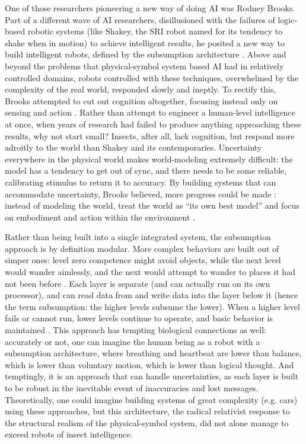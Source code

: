 One of those researchers pioneering a new way of doing AI was Rodney
Brooks. Part of a different wave of AI researchers, disillusioned with
the failures of logic-based robotic systems (like Shakey, the SRI
robot named for its tendency to shake when in motion) \cite[Ch. 10]{mccorduck} to
achieve intelligent results, he posited a new way to build intelligent
robots, defined by the subsumption architecture \cite[p. 353]{mobilebrooks}. Above and
beyond the problems that physical-symbol system based AI had in
relatively controlled domains, robots controlled with these
techniques, overwhelmed by the complexity of the real world, responded
slowly and ineptly. To rectify this, Brooks attempted to cut out
cognition altogether, focusing instead only on sensing and
action \cite[Afterword]{mccorduck}. Rather than attempt to engineer a
human-level intelligence at once, when years of research had failed to
produce anything approaching these results, why not start small?
Insects, after all, lack cognition, but respond more adroitly to the
world than Shakey and its contemporaries. Uncertainty everywhere in
the physical world makes world-modeling extremely difficult: the
model has a tendency to get out of sync, and there needs to be
some reliable, calibrating stimulus to return it to accuracy. By building systems that can
accommodate uncertainty, Brooks believed, more progress could be
made \cite[p. 347]{mobilebrooks}: instead of modeling the world, treat
the world as ``its own best model'' and focus on embodiment and action
within the environment \cite[p. 256]{ekbia}.

Rather than being built into a single integrated system, the
subsumption approach is by definition modular. More complex behaviors
are built out of simper ones: level zero competence might avoid objects,
while the next level would wander aimlessly, and the next would
attempt to wander to places it had not been before \cite[p.
  351--352]{mobilebrooks}. Each layer is separate (and can actually run 
on its own processor), and can read data from
and write data into the layer below it (hence the term subsumption: 
the higher levels subsume the lower). When a higher level fails or
cannot run, lower levels continue to operate, and basic behavior is
maintained \cite[p. 355]{mobilebrooks}. This approach has tempting
biological connections as well:
accurately or not, one can imagine the human being as a robot with a subsumption
architecture, where breathing and heartbeat are lower than balance,
which is lower than voluntary motion, which is lower than logical
thought. And temptingly, it is an approach that can handle
uncertainties, as each layer is built to be robust in the inevitable
event of inaccuracies and lost messages. Theoretically, one could
imagine building systems of great complexity (e.g. cars) using these approaches,
but this architecture, the radical relativist response to the
structural realism of the physical-symbol system, did not alone manage
to exceed robots of insect intelligence.

